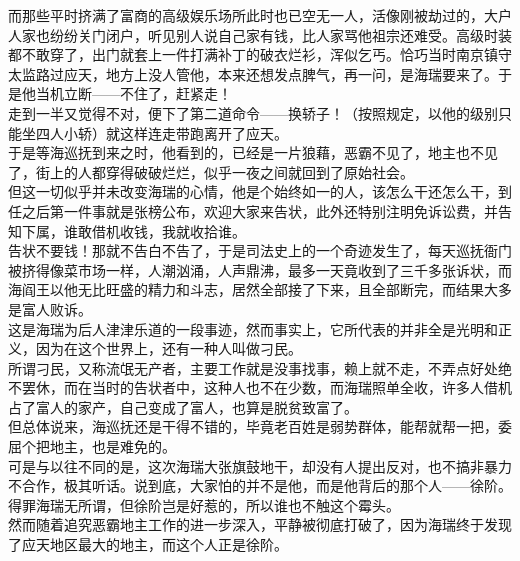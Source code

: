 \begin{multicols}{\theparacolNo}
而那些平时挤满了富商的高级娱乐场所此时也已空无一人，活像刚被劫过的，大户人家也纷纷关门闭户，听见别人说自己家有钱，比人家骂他祖宗还难受。高级时装都不敢穿了，出门就套上一件打满补丁的破衣烂衫，浑似乞丐。恰巧当时南京镇守太监路过应天，地方上没人管他，本来还想发点脾气，再一问，是海瑞要来了。于是他当机立断——不住了，赶紧走！\\

走到一半又觉得不对，便下了第二道命令——换轿子！（按照规定，以他的级别只能坐四人小轿）就这样连走带跑离开了应天。\\

于是等海巡抚到来之时，他看到的，已经是一片狼藉，恶霸不见了，地主也不见了，街上的人都穿得破破烂烂，似乎一夜之间就回到了原始社会。\\

但这一切似乎并未改变海瑞的心情，他是个始终如一的人，该怎么干还怎么干，到任之后第一件事就是张榜公布，欢迎大家来告状，此外还特别注明免诉讼费，并告知下属，谁敢借机收钱，我就收拾谁。\\

告状不要钱！那就不告白不告了，于是司法史上的一个奇迹发生了，每天巡抚衙门被挤得像菜市场一样，人潮汹涌，人声鼎沸，最多一天竟收到了三千多张诉状，而海阎王以他无比旺盛的精力和斗志，居然全部接了下来，且全部断完，而结果大多是富人败诉。\\

这是海瑞为后人津津乐道的一段事迹，然而事实上，它所代表的并非全是光明和正义，因为在这个世界上，还有一种人叫做刁民。\\

所谓刁民，又称流氓无产者，主要工作就是没事找事，赖上就不走，不弄点好处绝不罢休，而在当时的告状者中，这种人也不在少数，而海瑞照单全收，许多人借机占了富人的家产，自己变成了富人，也算是脱贫致富了。\\

但总体说来，海巡抚还是干得不错的，毕竟老百姓是弱势群体，能帮就帮一把，委屈个把地主，也是难免的。\\

可是与以往不同的是，这次海瑞大张旗鼓地干，却没有人提出反对，也不搞非暴力不合作，极其听话。说到底，大家怕的并不是他，而是他背后的那个人——徐阶。\\

得罪海瑞无所谓，但徐阶岂是好惹的，所以谁也不触这个霉头。\\

然而随着追究恶霸地主工作的进一步深入，平静被彻底打破了，因为海瑞终于发现了应天地区最大的地主，而这个人正是徐阶。\\


\end{multicols}
